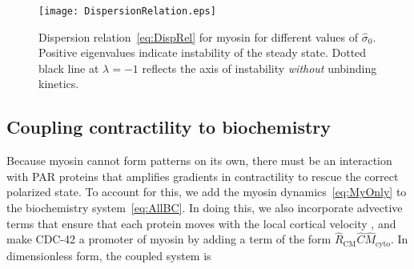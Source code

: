 \documentclass[11pt]{article}
\newcommand{\6}[1]{#1_{\text{6}}}
\newcommand{\3}[1]{#1_{\text{3}}}
\begin{document}
\begin{figure}
\centering
\texttt{[image: DispersionRelation.eps]}
\caption{\label{fig:DispRelMy}Dispersion relation\ \eqref{eq:DispRel} for myosin for different values of $\hat{\sigma}_0$. Positive eigenvalues indicate instability of the steady state. Dotted black line at $\lambda=-1$ reflects the axis of instability \emph{without} unbinding kinetics.}
\end{figure}

\subsection{Coupling contractility to biochemistry \label{sec:WithMy}}
Because myosin cannot form patterns on its own, there must be an interaction with PAR proteins that amplifies gradients in contractility to rescue the correct polarized state. To account for this, we add the myosin dynamics\ \eqref{eq:MyOnly} to the biochemistry system\ \eqref{eq:AllBC}. In doing this, we also incorporate advective terms that ensure that each protein moves with the local cortical velocity \cite{illukkumbura2023design}, and make CDC-42 a promoter of myosin by adding a term of the form $\hat R_\text{CM} \hat C \hat{M}_\text{cyto}$. In dimensionless form, the coupled system is 
\end{document}
